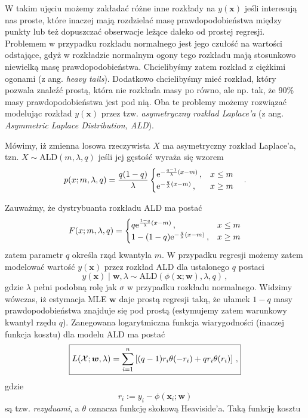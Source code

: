 \documentclass{myclass}
\numberwithin{equation}{subsection}
\begin{document}
W takim ujęciu możemy zakładać różne inne rozkłady na \(y(\bm{x})\) jeśli interesują nas proste,
które inaczej mają rozdzielać masę prawdopodobieństwa między punkty lub też dopuszczać obserwacje
leżące daleko od prostej regresji. Problemem w przypadku rozkładu normalnego jest jego czułość na
wartości odstające, gdyż w rozkładzie normalnym ogony tego rozkładu mają stosunkowo niewielką masę
prawdopodobieństwa. Chcielibyśmy zatem rozkład z ciężkimi ogonami (z ang. \textit{heavy tails}).
Dodatkowo chcielibyśmy mieć rozkład, który pozwala znaleźć prostą, która nie rozkłada masy po równo,
ale np. tak, że 90\% masy prawdopodobieństwa jest pod nią. Oba te problemy możemy rozwiązać
modelując rozkład \(y(\bm{x})\) przez tzw. \emph{asymetryczny rozkład Laplace'a} (z ang.
\textit{Asymmetric Laplace Distribution, ALD}).

\begin{definition}
Mówimy, iż zmienna losowa rzeczywista \(X\) ma asymetryczny rozkład Laplace'a, tzn. \(X \sim
\mathrm{ALD}(m, \lambda, q)\) jeśli jej gęstość wyraża się wzorem
\[
p(x; m,\lambda,q) = \frac{q(1-q)}{\lambda}\begin{cases}
    \mathrm{e}^{-\frac{q-1}{\lambda} (x - m)}\,,&x \leq m\\
    \mathrm{e}^{-\frac{q}{\lambda} (x - m)}\,,&x \geq m
\end{cases}\quad.
\]
\end{definition}
Zauważmy, że dystrybuanta rozkładu ALD ma postać
\[
F(x; m,\lambda,q) = \begin{cases}
    q \mathrm{e}^{\frac{1-q}{\lambda}(x - m)}\,,&x \leq m\\
    1 - (1-q)\mathrm{e}^{-\frac{q}{\lambda}(x - m)}\,,&x \geq m
\end{cases}
\]
zatem parametr \(q\) określa rząd kwantyla \(m\). W przypadku regresji możemy zatem modelować
wartość \(y(\bm{x})\) przez rozkład ALD dla ustalonego \(q\) postaci
\[
y(\bm{x}) \mid \bm{w}, \lambda \sim \mathrm{ALD}(\phi(\bm{x}; \bm{w}), \lambda, q)\,,
\]
gdzie \(\lambda\) pełni podobną rolę jak \(\sigma\) w przypadku rozkładu normalnego. Widzimy
wówczas, iż estymacja MLE \(\bm{w}\) daje prostą regresji taką, że ułamek \(1-q\) masy
prawdopodobieństwa znajduje się pod prostą (estymujemy zatem warunkowy kwantyl rzędu \(q\)).
Zanegowana logarytmiczna funkcja wiarygodności (inaczej funkcja kosztu) dla modelu ALD ma postać
\[
\boxed{
L(\mathcal{X}; \bm{w}, \lambda) = \sum_{i=1}^n \left[(q-1) r_i \theta(-r_i) + q r_i \theta(r_i)\right]\,,
}
\]
gdzie
\[
r_i := y_i - \phi(\bm{x}_i;\bm{w})
\]
są tzw. \emph{rezyduami}, a \(\theta\) oznacza funkcję skokową Heaviside'a. Taką funkcję kosztu
\end{document}
